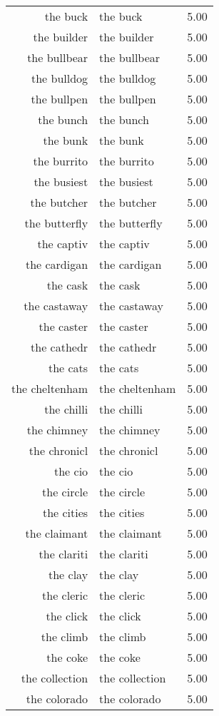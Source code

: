 \begin{table}[ht]
\begin{tabular}{rlr}
  the buck & the buck & 5.00 \\ 
  the builder & the builder & 5.00 \\ 
  the bullbear & the bullbear & 5.00 \\ 
  the bulldog & the bulldog & 5.00 \\ 
  the bullpen & the bullpen & 5.00 \\ 
  the bunch & the bunch & 5.00 \\ 
  the bunk & the bunk & 5.00 \\ 
  the burrito & the burrito & 5.00 \\ 
  the busiest & the busiest & 5.00 \\ 
  the butcher & the butcher & 5.00 \\ 
  the butterfly & the butterfly & 5.00 \\ 
  the captiv & the captiv & 5.00 \\ 
  the cardigan & the cardigan & 5.00 \\ 
  the cask & the cask & 5.00 \\ 
  the castaway & the castaway & 5.00 \\ 
  the caster & the caster & 5.00 \\ 
  the cathedr & the cathedr & 5.00 \\ 
  the cats & the cats & 5.00 \\ 
  the cheltenham & the cheltenham & 5.00 \\ 
  the chilli & the chilli & 5.00 \\ 
  the chimney & the chimney & 5.00 \\ 
  the chronicl & the chronicl & 5.00 \\ 
  the cio & the cio & 5.00 \\ 
  the circle & the circle & 5.00 \\ 
  the cities & the cities & 5.00 \\ 
  the claimant & the claimant & 5.00 \\ 
  the clariti & the clariti & 5.00 \\ 
  the clay & the clay & 5.00 \\ 
  the cleric & the cleric & 5.00 \\ 
  the click & the click & 5.00 \\ 
  the climb & the climb & 5.00 \\ 
  the coke & the coke & 5.00 \\ 
  the collection & the collection & 5.00 \\ 
  the colorado & the colorado & 5.00 \\ 

\end{tabular}
\end{table}
